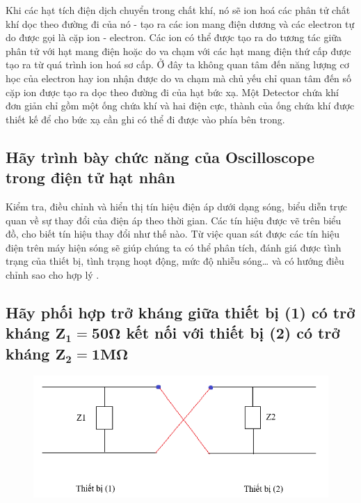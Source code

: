 \documentclass[12pt]{article}
\begin{document}
\indent Khi các hạt tích điện dịch chuyển trong chất khí, nó sẽ ion hoá các phân tử chất khí dọc theo đường đi của nó - tạo ra các ion mang điện dương và các electron tự do được gọi là cặp ion - electron. Các ion có thể được tạo ra do tương tác giữa phân tử với hạt mang điện hoặc do va chạm với các hạt mang điện thứ cấp được tạo ra từ quá trình ion hoá sơ cấp. Ở đây ta không quan tâm đến năng lượng cơ học của electron hay ion nhận được do va chạm mà chủ yếu chỉ quan tâm đến số cặp ion được tạo ra dọc theo đường đi của hạt bức xạ.  Một Detector chứa khí đơn giản chỉ gồm một ống chứa khí và hai điện cực, thành của ống chứa khí được thiết kế để cho bức xạ cần ghi có thể đi được vào phía bên trong.

\subsection{Hãy trình bày chức năng của Oscilloscope trong điện tử hạt nhân}

\indent Kiểm tra, điều chỉnh và hiển thị tín hiệu điện áp dưới dạng sóng, biểu diễn trực quan về sự thay đổi của điện áp theo thời gian. Các tín hiệu được vẽ trên biểu đồ, cho biết tín hiệu thay đổi như thế nào. Từ việc quan sát được các tín hiệu điện trên máy hiện sóng sẽ giúp chúng ta có thể phân tích, đánh giá được tình trạng của thiết bị, tình trạng hoạt động, mức độ nhiễu sóng… và có hướng điều chỉnh sao cho hợp lý .

\newpage
\subsection{Hãy phối hợp trở kháng giữa thiết bị (1) có trở kháng $\mathbf{Z}_\mathbf{1}=\mathbf{50}\mathbf{\Omega}$ kết nối với thiết bị (2) có trở kháng $\mathbf{Z}_\mathbf{2}=\mathbf{1}\mathbf{M\Omega}$}

\begin{figure}[h]
	\includegraphics[width=\textwidth]{mach dien}
\end{figure}
\end{document}
